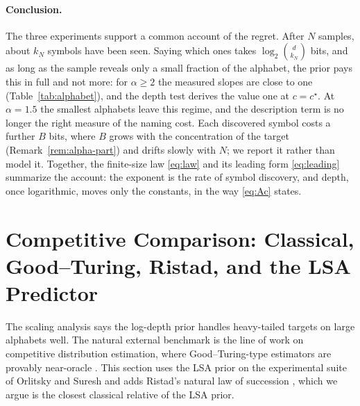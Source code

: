 \documentclass[11pt]{article}
\newcommand{\cstar}{c^{\star}}
\begin{document}
\paragraph{Conclusion.}
The three experiments support a common account of the regret. After
$N$ samples, about $k_N$ symbols have been seen. Saying which ones
takes $\log_2\binom{d}{k_N}$ bits, and as long as the sample
reveals only a small fraction of the alphabet, the prior pays this
in full and not more: for $\alpha \ge 2$ the measured slopes are close to
one (Table~\ref{tab:alphabet}), and the depth test derives the value one
at $c = \cstar$.
At $\alpha = 1.5$ the smallest
alphabets leave this regime, and the description term is no longer
the right measure of the naming cost. Each discovered symbol costs a
further $B$ bits, where $B$ grows with the concentration of the
target (Remark~\ref{rem:alpha-part}) and drifts slowly with $N$; we
report it rather than model it. Together, the finite-size law \eqref{eq:law} and its leading form
\eqref{eq:leading} summarize the account: the exponent is the rate of
symbol discovery, and depth, once logarithmic, moves only the constants,
in the way \eqref{eq:Ac} states.

\section{Competitive Comparison: Classical, Good--Turing, Ristad, and the LSA
Predictor}
\label{sec:comparison}
The scaling analysis says the log-depth prior handles heavy-tailed targets on
large alphabets well.  The natural external benchmark is the line of work on
competitive distribution estimation, where Good--Turing-type estimators are
provably near-oracle \cite{orlitsky2015competitive,acharya2013tight,
orlitsky2003always,mcallester2000leave}.  This section uses the LSA prior on the experimental suite of Orlitsky and Suresh
\cite{orlitsky2015competitive} and adds Ristad's natural law of succession
\cite{ristad1995natural}, which we argue is the closest classical relative of
the LSA prior.
\end{document}
